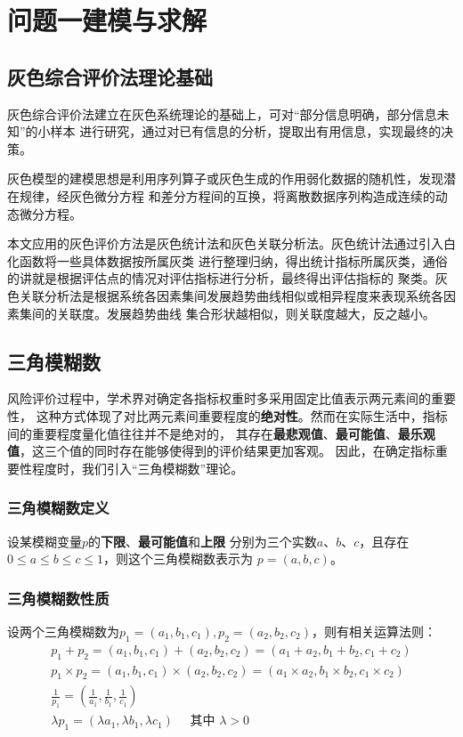 \documentclass[withoutpreface,bwprint]{cumcmthesis}
\begin{document}
    \section{问题一建模与求解}
    \subsection{灰色综合评价法理论基础}
        灰色综合评价法\cite{张波2013}建立在灰色系统理论的基础上，可对``部分信息明确，部分信息未知''的小样本
        进行研究，通过对已有信息的分析，提取出有用信息，实现最终的决策。 \par
        灰色模型的建模思想是利用序列算子或灰色生成的作用弱化数据的随机性，发现潜在规律，经灰色微分方程
        和差分方程间的互换，将离散数据序列构造成连续的动态微分方程。\par
        本文应用的灰色评价方法是灰色统计法和灰色关联分析法。灰色统计法通过引入白化函数将一些具体数据按所属灰类
        进行整理归纳，得出统计指标所属灰类，通俗的讲就是根据评估点的情况对评估指标进行分析，最终得出评估指标的
        聚类。灰色关联分析法是根据系统各因素集间发展趋势曲线相似或相异程度来表现系统各因素集间的关联度。发展趋势曲线
        集合形状越相似，则关联度越大，反之越小。
    \subsection{三角模糊数}
        风险评价过程中，学术界对确定各指标权重时多采用固定比值表示两元素间的重要性，
        这种方式体现了对比两元素间重要程度的\textbf{绝对性}。然而在实际生活中，指标间的重要程度量化值往往并不是绝对的，
        其存在\textbf{最悲观值}、\textbf{最可能值}、\textbf{最乐观值}，这三个值的同时存在能够使得到的评价结果更加客观。
        因此，在确定指标重要性程度时，我们引入``三角模糊数''理论\cite{ZENG2007137}。
        \subsubsection{三角模糊数定义}
            设某模糊变量$p$的\textbf{下限}、\textbf{最可能值}和\textbf{上限} 分别为三个实数$a$、$b$、$c$，且存在$0 \leq a \leq b \leq c \leq 1$，则这个三角模糊数表示为
            $ p = (a, b, c)$。
        \subsubsection{三角模糊数性质}
            设两个三角模糊数为$p_1 = (a_1, b_1, c_1), p_2 = (a_2, b_2, c_2)$，则有相关运算法则：
            \begin{gather}
                p_{1}+p_{2}=\left(a_{1}, b_{1}, c_{1}\right)+\left(a_{2}, b_{2}, c_{2}\right)=\left(a_{1}+a_{2}, b_{1}+b_{2}, c_{1}+c_{2}\right) \\
                p_{1} \times p_{2}=\left(a_{1}, b_{1}, c_{1}\right) \times\left(a_{2}, b_{2}, c_{2}\right)=\left(a_{1} \times a_{2}, b_{1} \times b_{2}, c_{1} \times c_{2}\right) \\
                \frac{1}{p_{1}}=\left(\frac{1}{a_{1}}, \frac{1}{b_{1}}, \frac{1}{c_{1}}\right) \\
                \lambda p_{1}=\left(\lambda a_{1}, \lambda b_{1}, \lambda c_{1}\right) \quad \text { 其中 } \lambda>0
            \end{gather}
\end{document}
